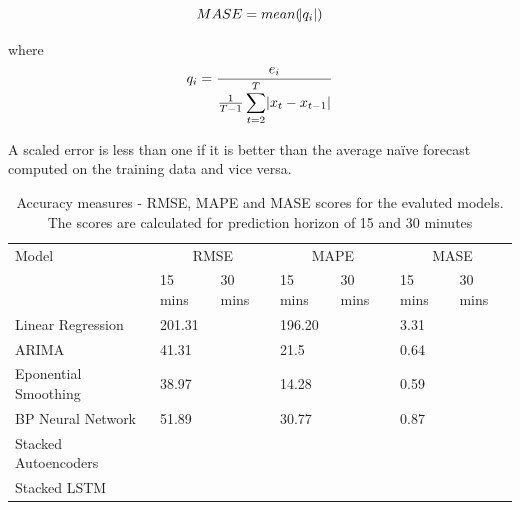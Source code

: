     \begin{equation}
        MASE = mean(\abs{q_{i}})
    \end{equation}

where
    \begin{equation}
        q_{i} = \frac{e_{i}}{\frac{1}{T-1} \displaystyle\sum_{t=2}^{T}\abs{x_{t} - x_{t-1}}}
    \end{equation}

A scaled error is less than one if it is better than the average naïve forecast computed on the
training data and vice versa.

\begin{table}
\centering
    \begin{tabular}{| l | l | l| l | l | l | l|} \hline
        Model & \multicolumn{2}{|c|}{RMSE} & \multicolumn{2}{|c|}{MAPE} &\multicolumn{2}{|c|}{MASE} \\
         & 15 mins & 30 mins & 15 mins & 30 mins & 15 mins & 30 mins \\ \hline
        Linear Regression & 201.31 &  & 196.20 &  & 3.31 &  \\
        ARIMA & 41.31 &  & 21.5 &   & 0.64 &  \\
        Eponential Smoothing & 38.97 &   & 14.28 &  & 0.59 &  \\
        BP Neural Network & 51.89 &  & 30.77 &  & 0.87 &  \\
        Stacked Autoencoders &  &  &  &  &  &  \\
        Stacked LSTM &  &  &  &  &  &  \\ \hline
    \end{tabular}
    \caption[Model comparisons]{Accuracy measures - RMSE, MAPE and MASE scores for the evaluted
    models. The scores are calculated for prediction horizon of 15 and 30 minutes}
\end{table}